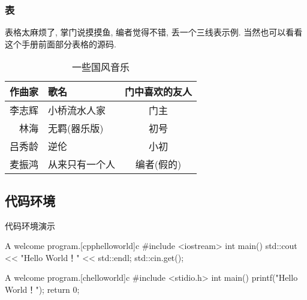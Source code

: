 \documentclass[hyperref, UTF8, CJK]{beamer}
\begin{document}
\cprotEnv\begin{frame}
	\frametitle{表}
	表格太麻烦了, 掌门说摸摸鱼, 编者觉得不错, 丢一个三线表示例. 当然也可以看看这个手册前面部分表格的源码.
	\begin{table}[htbp]
		\centering
		\caption{一些国风音乐}
		\label{tab:YixieGfyy}
		\begin{tabular}{rlc}
			\toprule
			作曲家 & 歌名 & 门中喜欢的友人 \\
			\midrule
			李志辉 & 小桥流水人家 & 门主 \\
			林海 & 无羁(器乐版) & 初号 \\
			吕秀龄 & 逆伦 & 小初 \\
			麦振鸿 & 从来只有一个人 & 编者(假的) \\
			\bottomrule
		\end{tabular}
	\end{table}
\end{frame}

\subsection{代码环境}
\begin{frame}[fragile]{代码环境演示}
	\onslide<2>
	\begin{scucode}{A welcome program.}[cpphelloworld]{c}
#include <iostream>
int main()
{
	std::cout << "Hello World！" << std::endl;
	std::cin.get();
}
	\end{scucode}
	\begin{scucode}{A welcome program.}[chelloworld]{c}
#include <stidio.h>
int main()
{
	printf("Hello World！");
	return 0;
}
	\end{scucode}
\end{frame}
\end{document}
